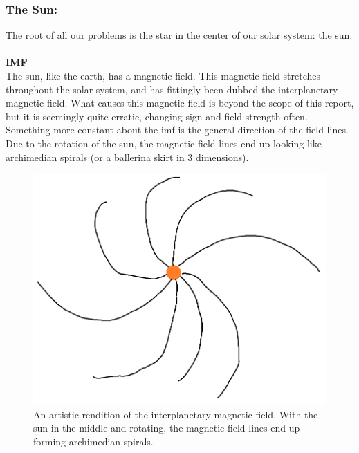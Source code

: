 \documentclass[norsk,a4paper,11pt]{article}
\begin{document}
\begin{multicols}{2}
	\subsubsection{The Sun:} 
		The root of all our problems is the star in the center of our solar system: the sun.\\
		\\
		\textbf{IMF}\\
		The sun, like the earth, has a magnetic field. This magnetic field stretches throughout the solar system, and has fittingly been dubbed the 						interplanetary magnetic field. What causes this magnetic field is beyond the scope of this report, but it is seemingly quite erratic, changing 				sign and field strength often.\\
		Something more constant about the imf is the general direction of the field lines. Due to the rotation of the sun, the magnetic field lines end up looking 			like archimedian spirals (or a ballerina skirt in 3 dimensions).
		\begin{figure}[H]
			\includegraphics[scale = 0.3]{Figures/artistic_imf.png}
			\centering
			\caption{An artistic rendition of the interplanetary magnetic field. With the sun in the middle and rotating, the magnetic field lines end up forming 					     archimedian spirals.}
			\label{fig::spirals}
		\end{figure}


\end{multicols}
\end{document}
